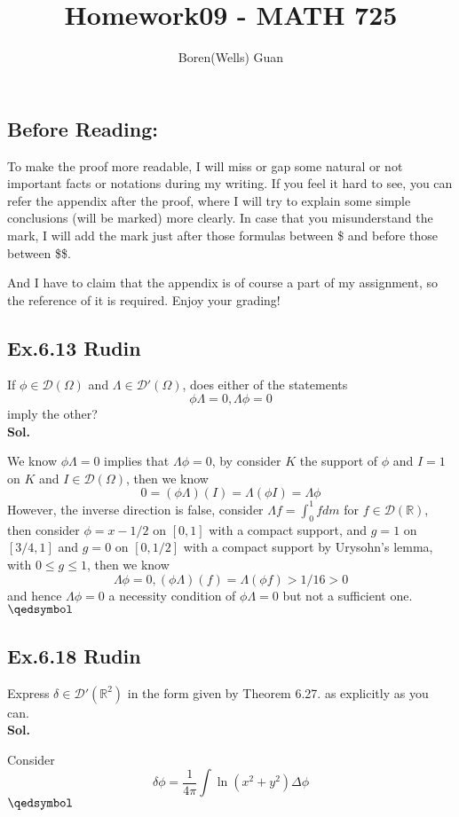 \documentclass[lang=en,11pt,a4paper,citestyle =authoryear]{elegantpaper}
\title{Homework09 - MATH 725}
\author{Boren(Wells) Guan}
\newcommand{\prvd}{$\hfill \qedsymbol$}
\newcommand{\R}{\mathbb{R}}
\newcommand{\D}{\mathscr{D}}
\begin{document}
\maketitle

\subsection*{Before Reading:}\par
To make the proof more readable, I will miss or gap some natural or not important facts or notations during my writing. If you feel it hard to see, you can refer the appendix after the proof, where I will try to explain some simple conclusions (will be marked) more clearly. In case that you misunderstand the mark, I will add the mark just after those formulas between \$ and before those between \$\$.\par
And I have to claim that the appendix is of course a part of my assignment, so the reference of it is required. Enjoy your grading!

\subsection*{Ex.6.13 Rudin} 
If $\phi \in \D(\Omega)$ and $\Lambda \in \D'(\Omega)$, does either of the statements
\[\phi\Lambda = 0, \Lambda \phi = 0\]
imply the other?
\vspace{0.5em}\\
\textbf{Sol.} \par
We know $\phi\Lambda = 0$ implies that $\Lambda\phi = 0$, by consider $K$ the support of $\phi$ and $I = 1$ on $K$ and $I\in \D(\Omega)$, then we know
\[0 = (\phi\Lambda)(I) = \Lambda(\phi I) = \Lambda\phi\]
However, the inverse direction is false, consider $\Lambda f = \int_0^1 f dm$ for $f\in \D(\R)$, then consider $\phi = x-1/2$ on $[0,1]$ with a compact support, and $g = 1$ on $[3/4,1]$ and $g = 0$ on $[0,1/2]$ with a compact support by Urysohn's lemma, with $0 \leq g\leq 1$, then we know
\[
\Lambda \phi = 0, (\phi\Lambda)(f) = \Lambda(\phi f) > 1/16 > 0
\]
and hence $\Lambda \phi = 0$ a necessity condition of $\phi\Lambda = 0$ but not a sufficient one. 
\prvd

\subsection*{Ex.6.18 Rudin} 
Express $\delta \in \D'(\R^2)$ in the form given by Theorem 6.27. as explicitly as you can.
\vspace{0.5em}\\
\textbf{Sol.} \par
Consider
\[\delta \phi = \dfrac{1}{4\pi} \int \ln(x^2+y^2)\Delta \phi\]
\prvd
\end{document}
